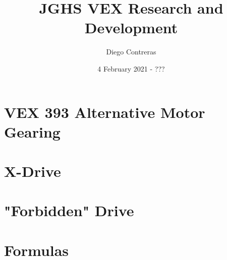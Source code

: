 \documentclass[12pt]{article}
\title{JGHS VEX Research and Development}
\author{Diego Contreras}
\date{4 February 2021 - ???}
\begin{document}
\maketitle
\newpage
\tableofcontents


















\section{VEX 393 Alternative Motor Gearing}
\section{X-Drive}
\section{"Forbidden" Drive}
\section{Formulas}



\end{document}
